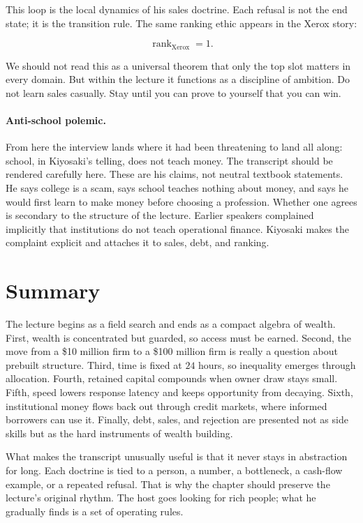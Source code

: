 This loop is the local dynamics of his sales doctrine. Each refusal is not the end state; it is the transition rule. The same ranking ethic appears in the Xerox story:

\begin{equation}
\operatorname{rank}_{\text{Xerox}} = 1.
\end{equation}

We should not read this as a universal theorem that only the top slot matters in every domain. But within the lecture it functions as a discipline of ambition. Do not learn sales casually. Stay until you can prove to yourself that you can win.

\paragraph{Anti-school polemic.} From here the interview lands where it had been threatening to land all along: school, in Kiyosaki's telling, does not teach money. The transcript should be rendered carefully here. These are his claims, not neutral textbook statements. He says college is a scam, says school teaches nothing about money, and says he would first learn to make money before choosing a profession. Whether one agrees is secondary to the structure of the lecture. Earlier speakers complained implicitly that institutions do not teach operational finance. Kiyosaki makes the complaint explicit and attaches it to sales, debt, and ranking.

\section{Summary}

The lecture begins as a field search and ends as a compact algebra of wealth. First, wealth is concentrated but guarded, so access must be earned. Second, the move from a \$10 million firm to a \$100 million firm is really a question about prebuilt structure. Third, time is fixed at \(24\) hours, so inequality emerges through allocation. Fourth, retained capital compounds when owner draw stays small. Fifth, speed lowers response latency and keeps opportunity from decaying. Sixth, institutional money flows back out through credit markets, where informed borrowers can use it. Finally, debt, sales, and rejection are presented not as side skills but as the hard instruments of wealth building.

What makes the transcript unusually useful is that it never stays in abstraction for long. Each doctrine is tied to a person, a number, a bottleneck, a cash-flow example, or a repeated refusal. That is why the chapter should preserve the lecture's original rhythm. The host goes looking for rich people; what he gradually finds is a set of operating rules.
